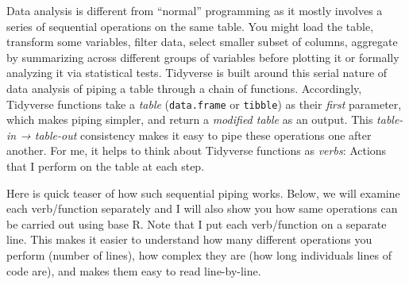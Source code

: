 \documentclass[
]{book}
\begin{document}
Data analysis is different from ``normal'' programming as it mostly involves a series of sequential operations on the same table. You might load the table, transform some variables, filter data, select smaller subset of columns, aggregate by summarizing across different groups of variables before plotting it or formally analyzing it via statistical tests. Tidyverse is built around this serial nature of data analysis of piping a table through a chain of functions. Accordingly, Tidyverse functions take a \emph{table} (\texttt{data.frame} or \texttt{tibble}) as their \emph{first} parameter, which makes piping simpler, and return a \emph{modified table} as an output. This \emph{table-in → table-out} consistency makes it easy to pipe these operations one after another. For me, it helps to think about Tidyverse functions as \emph{verbs}: Actions that I perform on the table at each step.

Here is quick teaser of how such sequential piping works. Below, we will examine each verb/function separately and I will also show you how same operations can be carried out using base R. Note that I put each verb/function on a separate line. This makes it easier to understand how many different operations you perform (number of lines), how complex they are (how long individuals lines of code are), and makes them easy to read line-by-line.
\end{document}
